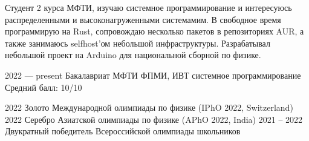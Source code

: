 \documentclass[9pt]{developercv} %
\begin{document}
\vspace{0.5cm}



\begin{minipage}[t]{0.55\textwidth} %
	\vspace{-\baselineskip} %
	
	Студент 2 курса МФТИ, изучаю системное программирование и интересуюсь распределенными и высоконагруженными системамим. В свободное время программирую на Rust, сопровождаю несколько пакетов в репозиториях AUR, а также занимаюсь selfhost'ом небольшой инфраструктуры. Разрабатывал небольшой проект на Arduino для национальной сборной по физике.
\end{minipage}
\hfill %
\begin{minipage}[t]{0.4\textwidth} %
	\vspace{-\baselineskip} %
	\begin{barchart}{5.5}
	\end{barchart}
\end{minipage}



\begin{entrylist}
	\entry
		{2022 — present}
		{Бакалавриат МФТИ ФПМИ, ИВТ системное программирование}
		{}
		{Средний балл: 10/10}

	\entry
		{2022}
		{Золото Международной олимпиады по физике (IPhO 2022, Switzerland)}
		{}
		{}
	\entry
		{2022}
		{Серебро Азиатской олимпиады по физике (APhO 2022, India)}
		{}
		{}
	\entry
		{2021 -- 2022}
		{Двукратный победитель Всероссийской олимпиады школьников}
		{}
		{}
\end{entrylist}
\end{document}
